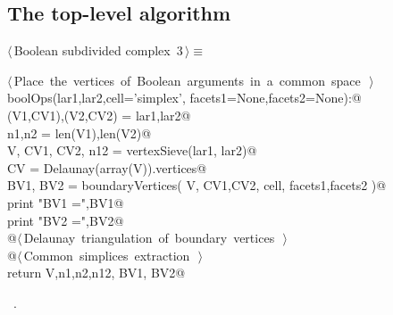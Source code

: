 \documentclass[11pt,oneside]{article}	%
\begin{document}
\subsection{The top-level algorithm}
\begin{flushleft} \small \label{scrap2}
\protect{}$\langle\,$Boolean subdivided complex\nobreak\ {\footnotesize 3}$\,\rangle\equiv$
\vspace{-1ex}
\begin{list}{}{} \item
\mbox{}\verb@@\hbox{$\langle\,$Place the vertices of Boolean arguments in a common space\nobreak\ {\footnotesize {}}$\,\rangle$}\verb@@\\
\mbox{}\verb@def boolOps(lar1,lar2,cell='simplex', facets1=None,facets2=None):@\\
\mbox{}\verb@   (V1,CV1),(V2,CV2) = lar1,lar2@\\
\mbox{}\verb@   n1,n2 = len(V1),len(V2)@\\
\mbox{}\verb@   V, CV1, CV2, n12 = vertexSieve(lar1, lar2)@\\
\mbox{}\verb@   CV = Delaunay(array(V)).vertices@\\
\mbox{}\verb@   BV1, BV2 = boundaryVertices( V, CV1,CV2, cell, facets1,facets2 )@\\
\mbox{}\verb@   print "\n BV1 =",BV1@\\
\mbox{}\verb@   print "\n BV2 =",BV2@\\
\mbox{}\verb@   @\hbox{$\langle\,$Delaunay triangulation of boundary vertices\nobreak\ {\footnotesize {}}$\,\rangle$}\verb@@\\
\mbox{}\verb@   @\hbox{$\langle\,$Common simplices extraction\nobreak\ {\footnotesize {}}$\,\rangle$}\verb@@\\
\mbox{}\verb@   return V,n1,n2,n12, BV1, BV2@\\
\mbox{}\verb@@{\NWsep}
\end{list}
\vspace{-1ex}
\footnotesize\addtolength{\baselineskip}{-1ex}
\begin{list}{}{\setlength{\itemsep}{-\parsep}\setlength{\itemindent}{-\leftmargin}}
\item \NWtxtMacroRefIn\ .
\end{list}
\end{flushleft}
\end{document}
